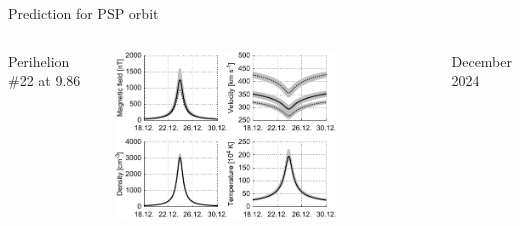 \begin{frame}[plain,c]{Prediction for PSP orbit}{}
	\begin{columns}[c]
	\column{\textwidth}
		
		\centering
		Perihelion \#22 at 9.86\,\Rs{}\\\ 
		
		\includegraphics[width=0.7\textwidth]{../talk_figures/SPP_perihelia_prediction_nearest_f_defense.pdf}
		
		
		December 2024
		
% 		
		
	\end{columns}
\end{frame}
